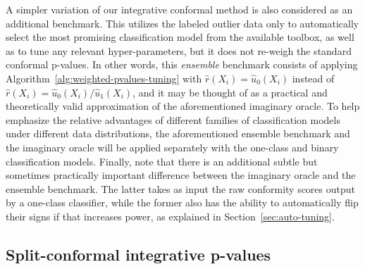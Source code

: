 \documentclass[11pt]{article}
\begin{document}
A simpler variation of our integrative conformal method is also considered as an additional benchmark.
This utilizes the labeled outlier data only to automatically select the most promising classification model from the available toolbox, as well as to tune any relevant hyper-parameters, but it does not re-weigh the standard conformal p-values. In other words, this {\em ensemble} benchmark consists of applying Algorithm~\ref{alg:weighted-pvalues-tuning} with $\hat{r}(X_i) = \hat{u}_0(X_i)$ instead of $\hat{r}(X_i) = \hat{u}_0(X_i) / \hat{u}_1(X_i)$, and it may be thought of as a practical and theoretically valid approximation of the aforementioned imaginary oracle. 
To help emphasize the relative advantages of different families of classification models under different data distributions, the aforementioned ensemble benchmark and the imaginary oracle will be applied separately with the one-class and binary classification models.
Finally, note that there is an additional subtle but sometimes practically important difference between the imaginary oracle and the ensemble benchmark.
The latter takes as input the raw conformity scores output by a one-class classifier, while the former also has the ability to automatically flip their signs if that increases power, as explained in Section~\ref{sec:auto-tuning}.


\subsection{Split-conformal integrative p-values} \label{sec:exp-split}
\end{document}
